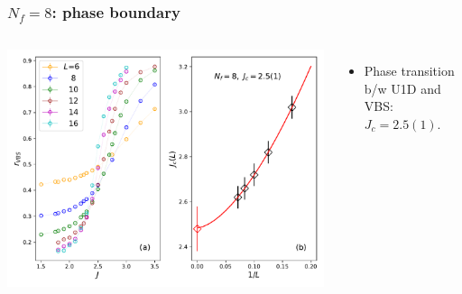 \documentclass[xcolor=table, 10pt, aspectratio=169]{beamer}
\begin{document}
\begin{frame}
  \frametitle{$N_f=8$: phase boundary}
  \begin{columns}
    \includegraphics[width=\textwidth]{n8rvbs}
		\begin{itemize}
			\item Phase transition b/w U1D and VBS: $J_c=2.5(1)$.
		\end{itemize}
  \end{columns}
\end{frame}
\end{document}
